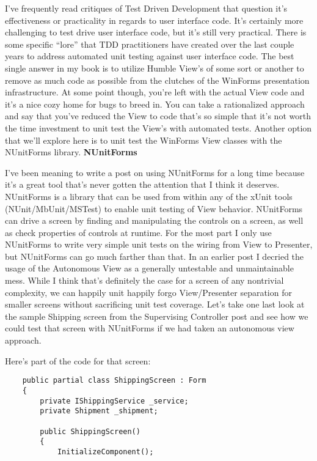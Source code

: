 \documentclass{article}
\begin{document}
{I've frequently read critiques of Test Driven Development that question it's effectiveness or practicality in regards to user interface code.  It's certainly more challenging to test drive user interface code, but it's still very practical.  There is some specific “lore” that TDD practitioners have created over the last couple years to address automated unit testing against user interface code.  The best single answer in my book is to utilize Humble View's of some sort or another to remove as much code as possible from the clutches of the WinForms presentation infrastructure.  At some point though, you're left with the actual View code and it's a nice cozy home for bugs to breed in.  You can take a rationalized approach and say that you've reduced the View to code that's so simple that it's not worth the time investment to unit test the View's with automated tests.  Another option that we'll explore here is to unit test the WinForms View classes with the  NUnitForms library.
\Large {\textbf{NUnitForms}}

I've been meaning to write a post on using NUnitForms for a long time because it's a great tool that's never gotten the attention that I think it deserves.  NUnitForms is a library that can be used from within any of the xUnit tools (NUnit/MbUnit/MSTest) to enable unit testing of View behavior.  NUnitForms can drive a screen by finding and manipulating the controls on a screen, as well as check properties of controls at runtime.  For the most part I only use NUnitForms to write very simple unit tests on the wiring from View to Presenter, but NUnitForms can go much farther than that.  In an earlier post I decried the usage of the Autonomous View as a generally untestable and unmaintainable mess.  While I think that's definitely the case for a screen of any nontrivial complexity, we can happily unit happily forgo View/Presenter separation for smaller screens without sacrificing unit test coverage.  Let's take one last look at the sample Shipping screen from the Supervising Controller post and see how we could test that screen with NUnitForms if we had taken an autonomous view approach.

Here's part of the code for that screen: 
\newpage
\begin{lstlisting}
    public partial class ShippingScreen : Form
    {
        private IShippingService _service;
        private Shipment _shipment; 

        public ShippingScreen()
        {
            InitializeComponent();


\end{lstlisting}}
\end{document}
